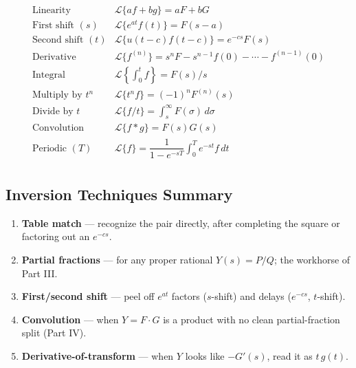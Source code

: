 \begin{formulabox}
\renewcommand{\arraystretch}{1.6}
\[
\begin{array}{ll}
\text{Linearity} & \mathcal{L}\{af+bg\} = aF+bG \\
\text{First shift } (s) & \mathcal{L}\{e^{at}f(t)\} = F(s-a) \\
\text{Second shift } (t) & \mathcal{L}\{u(t-c)f(t-c)\} = e^{-cs}F(s) \\
\text{Derivative} & \mathcal{L}\{f^{(n)}\} = s^n F - s^{n-1}f(0)-\cdots-f^{(n-1)}(0) \\
\text{Integral} & \mathcal{L}\left\{\int_0^t f\right\} = F(s)/s \\
\text{Multiply by } t^n & \mathcal{L}\{t^n f\} = (-1)^n F^{(n)}(s) \\
\text{Divide by } t & \mathcal{L}\{f/t\} = \int_s^\infty F(\sigma)\,d\sigma \\
\text{Convolution} & \mathcal{L}\{f*g\} = F(s)G(s) \\
\text{Periodic } (T) & \mathcal{L}\{f\} = \dfrac{1}{1-e^{-sT}}\int_0^T e^{-st}f\,dt \\
\end{array}
\]
\end{formulabox}

\subsection{Inversion Techniques Summary}

\begin{methodbox}
\begin{enumerate}
    \item \textbf{Table match} --- recognize the pair directly, after completing the
          square or factoring out an $e^{-cs}$.
    \item \textbf{Partial fractions} --- for any proper rational $Y(s)=P/Q$; the
          workhorse of Part III.
    \item \textbf{First/second shift} --- peel off $e^{at}$ factors ($s$-shift) and
          delays ($e^{-cs}$, $t$-shift).
    \item \textbf{Convolution} --- when $Y=F\cdot G$ is a product with no clean
          partial-fraction split (Part IV).
    \item \textbf{Derivative-of-transform} --- when $Y$ looks like $-G'(s)$, read it
          as $t\,g(t)$.
\end{enumerate}
\end{methodbox}


